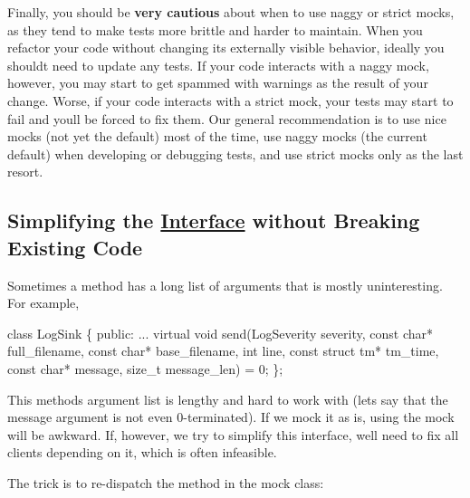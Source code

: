 Finally, you should be {\bfseries very cautious} about when to use naggy or strict mocks, as they tend to make tests more brittle and harder to maintain. When you refactor your code without changing its externally visible behavior, ideally you should\textquotesingle{}t need to update any tests. If your code interacts with a naggy mock, however, you may start to get spammed with warnings as the result of your change. Worse, if your code interacts with a strict mock, your tests may start to fail and you\textquotesingle{}ll be forced to fix them. Our general recommendation is to use nice mocks (not yet the default) most of the time, use naggy mocks (the current default) when developing or debugging tests, and use strict mocks only as the last resort.

\subsection*{Simplifying the \hyperlink{classInterface}{Interface} without Breaking Existing Code}

Sometimes a method has a long list of arguments that is mostly uninteresting. For example,


\begin{DoxyCode}
\textcolor{keyword}{class }LogSink \{
 \textcolor{keyword}{public}:
  ...
  \textcolor{keyword}{virtual} \textcolor{keywordtype}{void} send(LogSeverity severity, \textcolor{keyword}{const} \textcolor{keywordtype}{char}* full\_filename,
                    \textcolor{keyword}{const} \textcolor{keywordtype}{char}* base\_filename, \textcolor{keywordtype}{int} line,
                    \textcolor{keyword}{const} \textcolor{keyword}{struct} tm* tm\_time,
                    \textcolor{keyword}{const} \textcolor{keywordtype}{char}* message, \textcolor{keywordtype}{size\_t} message\_len) = 0;
\};
\end{DoxyCode}


This method\textquotesingle{}s argument list is lengthy and hard to work with (let\textquotesingle{}s say that the {\ttfamily message} argument is not even 0-\/terminated). If we mock it as is, using the mock will be awkward. If, however, we try to simplify this interface, we\textquotesingle{}ll need to fix all clients depending on it, which is often infeasible.

The trick is to re-\/dispatch the method in the mock class\+:



